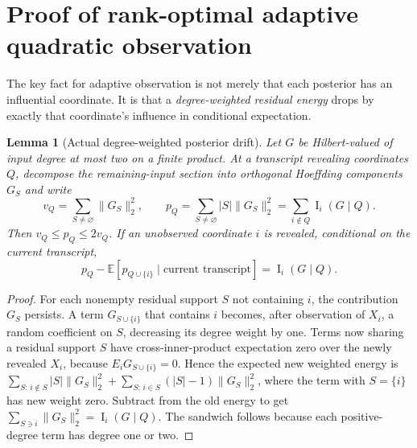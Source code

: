 \documentclass[11pt,letterpaper]{article}
\newtheorem{lemma}[theorem]{Lemma}
\theoremstyle{definition}\newtheorem{definition}[theorem]{Definition}
\newcommand{\E}{\mathbb E}
\newcommand{\Inf}{\operatorname{I}}
\newcommand{\norm}[1]{\lVert #1\rVert}
\begin{document}
\section{Proof of rank-optimal adaptive quadratic observation}\label{sec:policy}
The key fact for adaptive observation is not merely that each posterior has an influential coordinate. It is that a \emph{degree-weighted residual energy} drops by exactly that coordinate's influence in conditional expectation.

\begin{lemma}[Actual degree-weighted posterior drift]\label{lem:drift}
Let $G$ be Hilbert-valued of input degree at most two on a finite product. At a transcript revealing coordinates $Q$, decompose the remaining-input section into orthogonal Hoeffding components $G_S$ and write
\[
v_Q=\sum_{S\ne\varnothing}\norm{G_S}_2^2,\qquad
p_Q=\sum_{S\ne\varnothing}|S|\norm{G_S}_2^2=\sum_{i\notin Q}\Inf_i(G\mid Q).
\]
Then $v_Q\le p_Q\le2v_Q$. If an unobserved coordinate $i$ is revealed, conditional on the current transcript,
\begin{equation}\label{eq:drift}
p_Q-\E[p_{Q\cup\{i\}}\mid\text{current transcript}]=\Inf_i(G\mid Q).
\end{equation}
\end{lemma}
\begin{proof}
For each nonempty residual support $S$ not containing $i$, the contribution $G_S$ persists. A term $G_{S\cup\{i\}}$ that contains $i$ becomes, after observation of $X_i$, a random coefficient on $S$, decreasing its degree weight by one. Terms now sharing a residual support $S$ have cross-inner-product expectation zero over the newly revealed $X_i$, because $E_i G_{S\cup\{i\}}=0$. Hence the expected new weighted energy is
$\sum_{S:\,i\notin S}|S|\norm{G_S}_2^2 +\sum_{S:\,i\in S}(|S|-1)\norm{G_S}_2^2$,
where the term with $S=\{i\}$ has new weight zero. Subtract from the old energy to get $\sum_{S\ni i}\norm{G_S}_2^2=\Inf_i(G\mid Q)$. The sandwich follows because each positive-degree term has degree one or two.
\end{proof}
\end{document}
